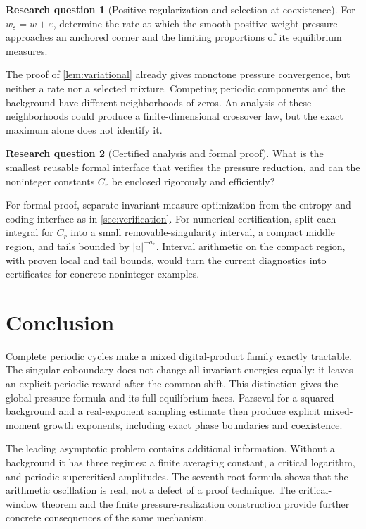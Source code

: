 \documentclass[11pt,a4paper]{article}
\numberwithin{equation}{section}
\theoremstyle{definition}
\newtheorem{question}{Research question}
\theoremstyle{remark}
\begin{document}
\begin{question}[Positive regularization and selection at coexistence]
For $w_\varepsilon=w+\varepsilon$, determine the rate at which the
smooth positive-weight pressure approaches an anchored corner and the
limiting proportions of its equilibrium measures.
\end{question}
The proof of \cref{lem:variational} already gives monotone pressure
convergence, but neither a rate nor a selected mixture. Competing
periodic components and the background have different neighborhoods
of zeros. An analysis of these neighborhoods could produce a
finite-dimensional crossover law, but the exact maximum alone does
not identify it.

\begin{question}[Certified analysis and formal proof]
What is the smallest reusable formal interface that verifies the
pressure reduction, and can the noninteger constants $C_r$ be enclosed
rigorously and efficiently?
\end{question}
For formal proof, separate invariant-measure optimization from the
entropy and coding interface as in \cref{sec:verification}. For
numerical certification, split each integral for $C_r$ into a small
removable-singularity interval, a compact middle region, and tails
bounded by $|u|^{-a_*}$. Interval arithmetic on the compact region,
with proven local and tail bounds, would turn the current diagnostics
into certificates for concrete noninteger examples.

\section{Conclusion}
Complete periodic cycles make a mixed digital-product family exactly
tractable. The singular coboundary does not change all invariant
energies equally: it leaves an explicit periodic reward after the
common shift. This distinction gives the global pressure formula and
its full equilibrium faces. Parseval for a squared background and a
real-exponent sampling estimate then produce explicit mixed-moment
growth exponents, including exact phase boundaries and coexistence.

The leading asymptotic problem contains additional information. Without
a background it has three regimes: a finite averaging constant, a
critical logarithm, and periodic supercritical amplitudes. The
seventh-root formula shows that the arithmetic oscillation is real,
not a defect of a proof technique. The critical-window theorem and the
finite pressure-realization construction provide further concrete
consequences of the same mechanism.
\end{document}
